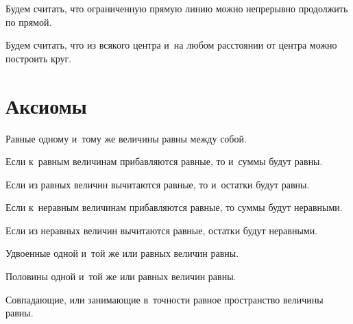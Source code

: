 \documentclass[letters,booklanguage=russian]{byrnebook}
\begin{document}
\startpostulate{}\label{post:I.II}
\begin{center}
Будем считать, что ограниченную прямую линию можно непрерывно продолжить по прямой.
\end{center}

\startpostulate{}\label{post:I.III}
\begin{center}
Будем считать, что из всякого центра и~на любом расстоянии от центра можно построить круг.
\end{center}

\vfill\pagebreak

\chapter*{Аксиомы}

\startaxiom{}\label{ax:I.I}
\begin{center}
Равные одному и~тому же величины равны между собой.
\end{center}

\startaxiom{}\label{ax:I.II}
\begin{center}
Если к~равным величинам прибавляются равные, то и~суммы будут равны.
\end{center}

\startaxiom{}\label{ax:I.III}
\begin{center}
Если из равных величин вычитаются равные, то и~остатки будут равны.
\end{center}

\startaxiom{}\label{ax:I.IV}
\begin{center}
Если к~неравным величинам прибавляются равные, то суммы будут неравными.
\end{center}

\startaxiom{}\label{ax:I.V}
\begin{center}
Если из неравных величин вычитаются  равные, остатки будут неравными.
\end{center}

\startaxiom{}\label{ax:I.VI}
\begin{center}
Удвоенные одной и~той же или равных величин равны.
\end{center}

\startaxiom{}\label{ax:I.VII}
\begin{center}
Половины одной и~той же или равных величин равны.
\end{center}

\startaxiom{}\label{ax:I.VIII}
\begin{center}
Совпадающие, или занимающие в~точности равное пространство величины равны.
\end{center}
\end{document}
